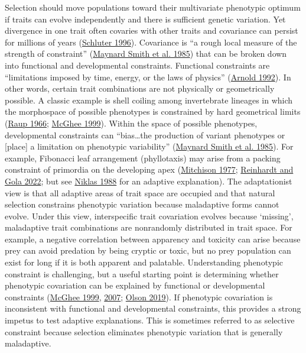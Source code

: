 \documentclass[
  12pt,
]{article}
\begin{document}
Selection should move populations toward their multivariate phenotypic optimum if traits can evolve independently and there is sufficient genetic variation. Yet divergence in one trait often covaries with other traits and covariance can persist for millions of years (\protect\hyperlink{ref-schluter_adaptive_1996}{Schluter 1996}). Covariance is ``a rough local measure of the strength of constraint'' (\protect\hyperlink{ref-maynard_smith_developmental_1985}{Maynard Smith et al. 1985}) that can be broken down into functional and developmental constraints. Functional constraints are ``limitations imposed by time, energy, or the laws of physics'' (\protect\hyperlink{ref-arnold_constraints_1992}{Arnold 1992}). In other words, certain trait combinations are not physically or geometrically possible. A classic example is shell coiling among invertebrate lineages in which the morphospace of possible phenotypes is constrained by hard geometrical limits (\protect\hyperlink{ref-raup_geometric_1966}{Raup 1966}; \protect\hyperlink{ref-mcghee_theoretical_1999}{McGhee 1999}). Within the space of possible phenotypes, developmental constraints can ``bias\ldots the production of variant phenotypes or {[}place{]} a limitation on phenotypic variability'' (\protect\hyperlink{ref-maynard_smith_developmental_1985}{Maynard Smith et al. 1985}). For example, Fibonacci leaf arrangement (phyllotaxis) may arise from a packing constraint of primordia on the developing apex (\protect\hyperlink{ref-mitchison_phyllotaxis_1977}{Mitchison 1977}; \protect\hyperlink{ref-reinhardt_law_2022}{Reinhardt and Gola 2022}; but see \protect\hyperlink{ref-niklas_role_1988}{Niklas 1988} for an adaptive explanation). The adaptationist view is that all adaptive areas of trait space are occupied and that natural selection constrains phenotypic variation because maladaptive forms cannot evolve. Under this view, interspecific trait covariation evolves because `missing', maladaptive trait combinations are nonrandomly distributed in trait space. For example, a negative correlation between apparency and toxicity can arise because prey can avoid predation by being cryptic or toxic, but no prey population can exist for long if it is both apparent and palatable. Understanding phenotypic constraint is challenging, but a useful starting point is determining whether phenotypic covariation can be explained by functional or developmental constraints (\protect\hyperlink{ref-mcghee_theoretical_1999}{McGhee 1999}, \protect\hyperlink{ref-mcghee_geometry_2007}{2007}; \protect\hyperlink{ref-olson_plant_2019}{Olson 2019}). If phenotypic covariation is inconsistent with functional and developmental constraints, this provides a strong impetus to test adaptive explanations. This is sometimes referred to as selective constraint because selection eliminates phenotypic variation that is generally maladaptive.
\end{document}
